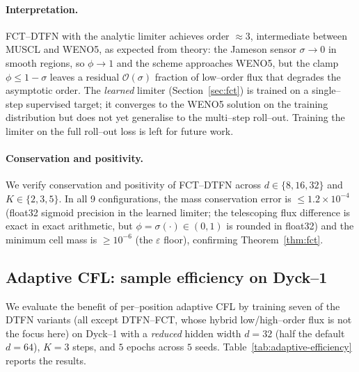 \documentclass[10pt]{article}
\theoremstyle{definition}
\theoremstyle{remark}
\begin{document}
\paragraph{Interpretation.}
FCT--DTFN with the analytic limiter achieves order $\approx 3$,
intermediate between MUSCL and WENO5, as expected from theory: the
Jameson sensor $\sigma \to 0$ in smooth regions, so $\phi \to 1$ and
the scheme approaches WENO5, but the clamp $\phi \le 1 - \sigma$
leaves a residual $\mathcal{O}(\sigma)$ fraction of low--order flux
that degrades the asymptotic order.  The \emph{learned} limiter
(Section~\ref{sec:fct}) is trained on a single--step supervised
target; it converges to the WENO5 solution on the training
distribution but does not yet generalise to the multi--step roll--out.
Training the limiter on the full roll--out loss is left for future
work.

\paragraph{Conservation and positivity.}
We verify conservation and positivity of FCT--DTFN across
$d \in \{8, 16, 32\}$ and $K \in \{2, 3, 5\}$.  In all 9
configurations, the mass conservation error is $\le 1.2 \times
10^{-4}$ (float32 sigmoid precision in the learned limiter; the
telescoping flux difference is exact in exact arithmetic, but
$\phi = \sigma(\cdot) \in (0,1)$ is rounded in float32) and the
minimum cell mass is $\ge 10^{-6}$
(the $\varepsilon$ floor), confirming Theorem~\ref{thm:fct}.

\subsection{Adaptive CFL: sample efficiency on Dyck--1}
\label{sec:exp-adaptive}

We evaluate the benefit of per--position adaptive CFL by training
seven of the DTFN variants (all except DTFN--FCT, whose hybrid
low/high--order flux is not the focus here) on Dyck--1 with a
\emph{reduced} hidden width
$d = 32$ (half the default $d = 64$), $K = 3$ steps, and $5$ epochs
across $5$ seeds.  Table~\ref{tab:adaptive-efficiency} reports the
results.
\end{document}
